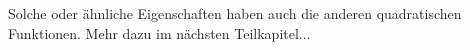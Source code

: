 Solche oder ähnliche Eigenschaften haben auch die anderen quadratischen Funktionen. Mehr dazu im nächsten Teilkapitel...
